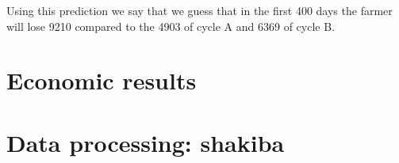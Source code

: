 \documentclass[11pt]{article}
\begin{document}
Using this prediction we say that we guess that in the first 400 days the farmer will lose 9210 compared to the 4903 of cycle A and 6369 of cycle B.

\section{Economic results}

\section{Data processing: shakiba}
\end{document}
